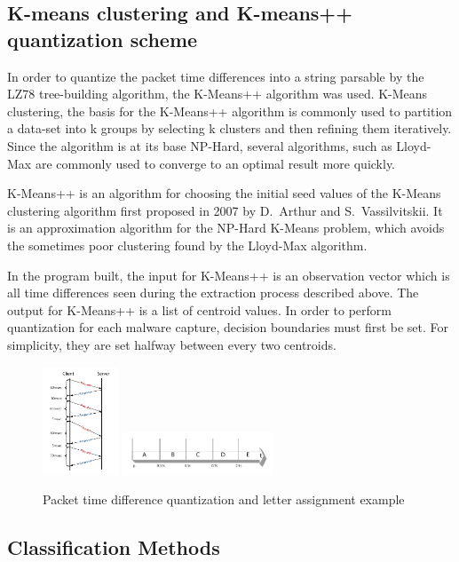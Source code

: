 \documentclass[13pt,journal,compsoc,onecolumn]{IEEEtran}
\begin{document}
\subsection{K-means clustering and K-means++ quantization scheme}
In order to quantize the packet time differences into a string parsable by the LZ78 tree-building algorithm, the K-Means++ algorithm was used.
K-Means clustering, the basis for the K-Means++ algorithm is commonly used to partition a data-set into k groups by selecting k clusters and then refining them iteratively. Since the algorithm is at its base NP-Hard, several algorithms, such as Lloyd-Max are commonly used to converge to an optimal result more quickly.

K-Means++ \cite{Art07} is an algorithm for choosing the initial seed values of the K-Means clustering algorithm first proposed in 2007 by D.~Arthur and S.~Vassilvitskii. It is an approximation algorithm for the NP-Hard K-Means problem, which avoids the sometimes poor clustering found by the Lloyd-Max algorithm.

In the program built, the input for K-Means++ is an observation vector which is all time differences seen during the extraction process described above.
The output for K-Means++ is a list of centroid values.
In order to perform quantization for each malware capture, decision boundaries must first be set. For simplicity, they are set halfway between every two centroids.
\begin{figure}[!h]
 \centering
 \includegraphics[width=0.2\textwidth]{fig2.pdf}
 \includegraphics[width=0.4\textwidth]{fig3.pdf}
 \caption{Packet time difference quantization and letter assignment example\label{fig:packetquant}}
\end{figure} 
\subsection{Classification Methods}
\end{document}

